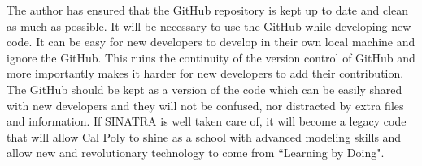 \indent The author has ensured that the GitHub\textsuperscript{\textregistered} repository is kept up to date and clean as much as possible. It will be necessary to use the GitHub\textsuperscript{\textregistered} while developing new code. It can be easy for new developers to develop in their own local machine and ignore the GitHub\textsuperscript{\textregistered}. This ruins the continuity of the version control of GitHub\textsuperscript{\textregistered} and more importantly makes it harder for new developers to add their contribution. The GitHub\textsuperscript{\textregistered} should be kept as a version of the code which can be easily shared with new developers and they will not be confused, nor distracted by extra files and information. If SINATRA is well taken care of, it will become a legacy code that will allow Cal Poly to shine as a school with advanced modeling skills and allow new and revolutionary technology to come from ``Learning by Doing".




